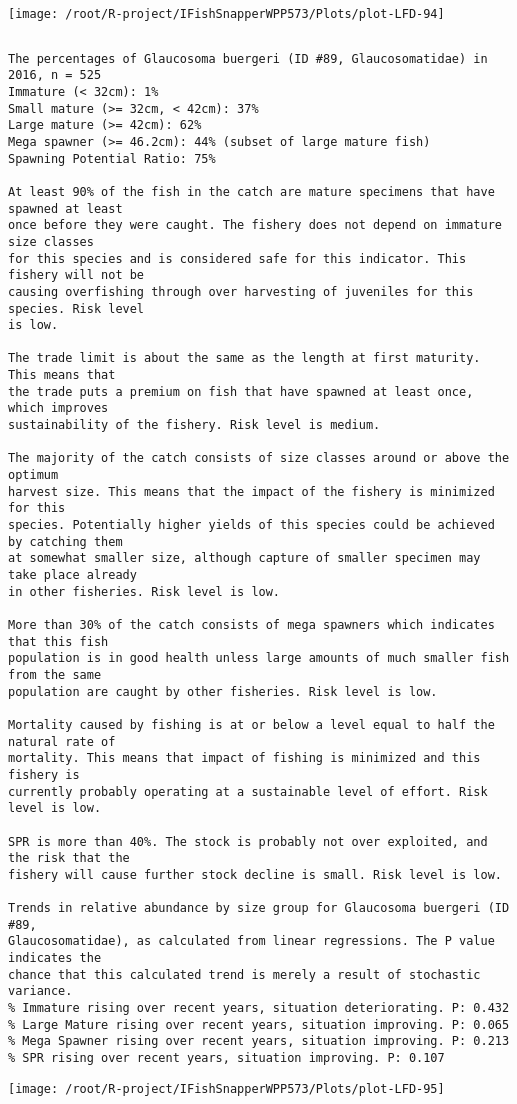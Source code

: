 \documentclass{report}\usepackage[]{graphicx}\usepackage[]{color}
\makeatletter
\def\maxwidth{ %
  \ifdim\Gin@nat@width>\linewidth
    \linewidth
  \else
    \Gin@nat@width
  \fi
}
\newenvironment{kframe}{%
 \def\at@end@of@kframe{}%
 \ifinner\ifhmode%
  \def\at@end@of@kframe{\end{minipage}}%
  \begin{minipage}{\columnwidth}%
 \fi\fi%
 \def\FrameCommand##1{\hskip\@totalleftmargin \hskip-\fboxsep
 \colorbox{shadecolor}{##1}\hskip-\fboxsep
     \hskip-\linewidth \hskip-\@totalleftmargin \hskip\columnwidth}%
 \MakeFramed {\advance\hsize-\width
   \@totalleftmargin\z@ \linewidth\hsize
   \@setminipage}}%
 {\par\unskip\endMakeFramed%
 \at@end@of@kframe}
\newenvironment{knitrout}{}{} %
\makeatother
\begin{document}
\begin{knitrout}
\texttt{[image: /root/R-project/IFishSnapperWPP573/Plots/plot-LFD-94]} 
\begin{kframe}\begin{verbatim}
\end{verbatim}
\end{kframe}
\clearpage
\newpage
\begin{kframe}\begin{verbatim}The percentages of Glaucosoma buergeri (ID #89, Glaucosomatidae) in 2016, n = 525
Immature (< 32cm): 1%
Small mature (>= 32cm, < 42cm): 37%
Large mature (>= 42cm): 62%
Mega spawner (>= 46.2cm): 44% (subset of large mature fish)
Spawning Potential Ratio: 75%
 
At least 90% of the fish in the catch are mature specimens that have spawned at least
once before they were caught. The fishery does not depend on immature size classes
for this species and is considered safe for this indicator. This fishery will not be
causing overfishing through over harvesting of juveniles for this species. Risk level
is low.

The trade limit is about the same as the length at first maturity.  This means that
the trade puts a premium on fish that have spawned at least once, which improves
sustainability of the fishery. Risk level is medium.

The majority of the catch consists of size classes around or above the optimum
harvest size. This means that the impact of the fishery is minimized for this
species. Potentially higher yields of this species could be achieved by catching them
at somewhat smaller size, although capture of smaller specimen may take place already
in other fisheries. Risk level is low.

More than 30% of the catch consists of mega spawners which indicates that this fish
population is in good health unless large amounts of much smaller fish from the same
population are caught by other fisheries. Risk level is low.
 
Mortality caused by fishing is at or below a level equal to half the natural rate of
mortality. This means that impact of fishing is minimized and this fishery is
currently probably operating at a sustainable level of effort. Risk level is low.
 
SPR is more than 40%. The stock is probably not over exploited, and the risk that the
fishery will cause further stock decline is small. Risk level is low.
 
Trends in relative abundance by size group for Glaucosoma buergeri (ID #89,
Glaucosomatidae), as calculated from linear regressions. The P value indicates the
chance that this calculated trend is merely a result of stochastic variance.
% Immature rising over recent years, situation deteriorating. P: 0.432
% Large Mature rising over recent years, situation improving. P: 0.065
% Mega Spawner rising over recent years, situation improving. P: 0.213
% SPR rising over recent years, situation improving. P: 0.107
\end{verbatim}
\end{kframe}
\texttt{[image: /root/R-project/IFishSnapperWPP573/Plots/plot-LFD-95]} 


\end{knitrout}
\end{document}
